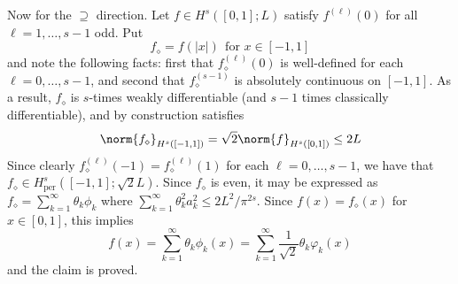\documentclass{article}
\newcommand{\abs}[1]{\left \lvert #1 \right \rvert}
\newcommand{\1}{\mathbf{1}}
\theoremstyle{alden}
\theoremstyle{aldenthm}
\theoremstyle{definition}
\theoremstyle{remark}
\begin{document}
Now for the $\supseteq$ direction. Let $f \in H^s([0,1];L)$ satisfy $f^{(\ell)}(0)$ for all $\ell = 1,\ldots,s - 1$ odd. Put
\begin{equation*}
f_{\diamond} = f(\abs{x})~~\textrm{for $x \in [-1,1]$}
\end{equation*}
and note the following facts: first that $f_{\diamond}^{(\ell)}(0)$ is well-defined for each $\ell = 0,\ldots, s - 1$, and second that $f_{\diamond}^{(s - 1)}$ is absolutely continuous on $[-1,1]$. As a result, $f_{\diamond}$ is $s$-times weakly differentiable (and $s - 1$ times classically differentiable), and by construction satisfies
\begin{equation*}
\norm{f_{\diamond}}_{H^s([-1,1])} = \sqrt{2} \norm{f}_{H^s([0,1])} \leq 2L
\end{equation*} 
Since clearly $f_{\diamond}^{(\ell)}(-1) = f_{\diamond}^{(\ell)}(1)$ for each $\ell = 0,\ldots, s - 1$, we have that $f_{\diamond} \in H_{\mathrm{per}}^s([-1,1];\sqrt{2}L)$. Since $f_{\diamond}$ is even, it may be expressed as $f_{\diamond} = \sum_{k = 1}^{\infty} \theta_k \phi_k$ where $\sum_{k = 1}^{\infty} \theta_k^2 a_k^{2} \leq 2L^2/\pi^{2s}$. Since $f(x) = f_{\diamond}(x)$ for $x \in [0,1]$, this implies
\begin{equation*}
f(x) = \sum_{k = 1}^{\infty} \theta_k \phi_k(x) = \sum_{k = 1}^{\infty} \frac{1}{\sqrt{2}}\theta_k \varphi_k(x) 
\end{equation*}
and the claim is proved.
\end{document}
